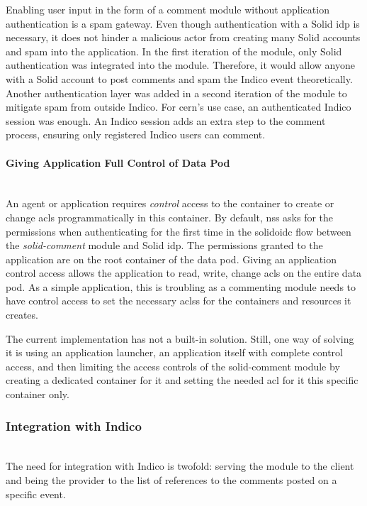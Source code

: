 Enabling user input in the form of a comment module without application authentication is a spam gateway. Even though authentication with a Solid \gls{idp} is necessary, it does not hinder a malicious actor from creating many Solid accounts and spam into the application. In the first iteration of the module, only Solid authentication was integrated into the module. Therefore, it would allow anyone with a Solid account to post comments and spam the Indico event theoretically. Another authentication layer was added in a second iteration of the module to mitigate spam from outside Indico. For \gls{cern}’s use case, an authenticated Indico session was enough. An Indico session adds an extra step to the comment process, ensuring only registered Indico users can comment.
\vspace{0.5cm}
\paragraph{Giving Application Full Control of Data Pod}\mbox{}\\

An agent or application requires \textit{control} access to the container to create or change \glspl{acl} programmatically in this container. By default, \gls{nss} asks for the permissions when authenticating for the first time in the \gls{solidoidc} flow between the \textit{solid-comment} module and Solid \gls{idp}. The permissions granted to the application are on the root container of the data pod. Giving an application control access allows the application to read, write, change \glspl{acl} on the entire data pod. As a simple application, this is troubling as a commenting module needs to have control access to set the necessary \glspl{acls} for the containers and resources it creates.

The current implementation has not a built-in solution. Still, one way of solving it is using an application launcher, an application itself with complete control access, and then limiting the access controls of the solid-comment module by creating a dedicated container for it and setting the needed \gls{acl} for it this specific container only. 

\subsubsection{Integration with Indico}\mbox{}\\

The need for integration with Indico is twofold: serving the module to the client and being the provider to the list of references to the comments posted on a specific event.
\vspace{0.5cm}
